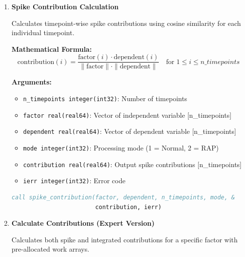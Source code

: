 \documentclass[11pt]{article}
\begin{document}
\begin{enumerate}
\begin{enumerate}
	      	\item \textbf{Spike Contribution Calculation}
	      	      
	      	      Calculates timepoint-wise spike contributions using cosine similarity for
	      	      each individual timepoint.
	      	      
	      	      \textbf{Mathematical Formula:}
	      	      \[
	      	      	\text{contribution}(i) = \frac{\text{factor}(i) \cdot \text{dependent}(i)}{\|\text{factor}\|
	      	      		\cdot \|\text{dependent}\|}\quad \text{for }1 \le i \le n\_timepoints
	      	      \]
	      	      
	      	      \textbf{Arguments:}
	      	      \begin{itemize}
	      	      	\item \texttt{n\_timepoints integer(int32)}: Number of timepoints
	      	      	      
	      	      	\item \texttt{factor real(real64)}: Vector of independent variable [n\_timepoints]
	      	      	      
	      	      	\item \texttt{dependent real(real64)}: Vector of dependent variable [n\_timepoints]
	      	      	      
	      	      	\item \texttt{mode integer(int32)}: Processing mode (1 = Normal, 2 =
	      	      	      RAP)
	      	      	      
	      	      	\item \texttt{contribution real(real64)}: Output spike contributions
	      	      	      [n\_timepoints]
	      	      	      
	      	      	\item \texttt{ierr integer(int32)}: Error code
	      	      \end{itemize}
	      	      \begin{lstlisting}[language=Fortran, caption={Spike Contribution Calculation}]
call spike_contribution(factor, dependent, n_timepoints, mode, &
                        contribution, ierr)
	      	      \end{lstlisting}
	      	      
	      	\item \textbf{Calculate Contributions (Expert Version)}
	      	      
	      	      Calculates both spike and integrated contributions for a specific factor
	      	      with pre-allocated work arrays.
	      	      

\end{enumerate}
\end{enumerate}
\end{document}
